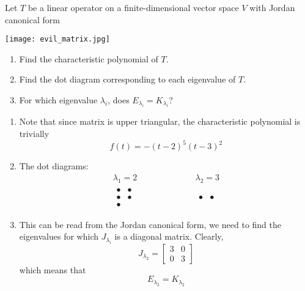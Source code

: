 \begin{homeworkProblem}
  Let $T$ be a linear operator on a finite-dimensional vector space $V$ with Jordan canonical form

  \texttt{[image: evil\_matrix.jpg]}

  \begin{enumerate}
    \item Find the characteristic polynomial of $T$.
    \item Find the dot diagram corresponding to each eigenvalue of $T$.
    \item For which eigenvalue $\lambda_i$, does $E_{\lambda_i} = K_{\lambda_i}$?
  \end{enumerate}


\solution

\begin{enumerate}
  \item Note that since matrix is upper triangular, the characteristic polynomial is trivially
  \[f(t) = -(t-2)^5(t-3)^2\]
  \item The dot diagrams:
  \[
    \begin{aligned}
      \lambda_1 = 2 \qquad &\qquad \qquad \lambda_2 = 3 \\
      \begin{matrix}
        \bullet & \bullet \\
        \bullet & \bullet \\
        \bullet & \phantom{\bullet}
      \end{matrix} \qquad &\qquad \qquad
      \begin{matrix}
        \bullet & \bullet
      \end{matrix}
    \end{aligned}
  \]
  \item This can be read from the Jordan canonical form, we need to find the eigenvalues for which $J_{\lambda_i}$ is a diagonal matrix. Clearly,
  \[
    J_{\lambda_2} = \begin{bmatrix}
      3 & 0 \\
      0 & 3
    \end{bmatrix}
  \]
  which means that
  \[
    E_{\lambda_2} = K_{\lambda_2}
  \]
\end{enumerate}

\end{homeworkProblem}
